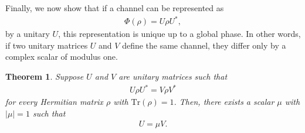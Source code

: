 \documentclass[sn-mathphys-num]{sn-jnl}%
\theoremstyle{thmstyleone}%
\newtheorem{theorem}{Theorem}%
\theoremstyle{thmstyletwo}%
\theoremstyle{thmstylethree}%
\begin{document}
Finally, we now show that if a channel can be represented as
    \begin{eqnarray*}
        \Phi(\rho)=U\rho U^*,
    \end{eqnarray*}
    by a unitary $U$, this representation is unique up to a global phase. In other words, if two unitary matrices $U$ and $V$ define the same channel, they differ only by a complex scalar of modulus one.
    \begin{theorem}\label{thm:global-theorem}
        Suppose $U$ and $V$ are unitary matrices such that
        \begin{eqnarray*}
            U\rho U^* = V\rho V^*
        \end{eqnarray*}
        for every Hermitian matrix $\rho$ with $\mbox{Tr}(\rho)=1$. Then, there exists a scalar $\mu$ with $|\mu|=1$ such that
        \begin{eqnarray*}
            U = \mu V.
        \end{eqnarray*}
    \end{theorem}
\end{document}
